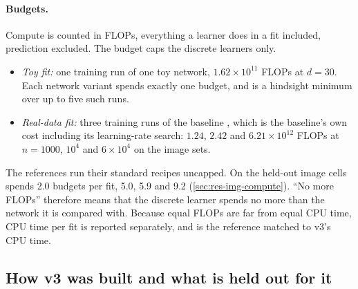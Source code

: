\paragraph{Budgets.} Compute is counted in FLOPs, everything a learner does in a fit included, prediction excluded. The budget caps the discrete learners only.
\begin{itemize}
\item \emph{Toy fit:} one training run of one toy network, $1.62\times10^{11}$ FLOPs at $d=30$. Each network variant spends exactly one budget, and  is a hindsight minimum over up to five such runs.
\item \emph{Real-data fit:} three training runs of the baseline , which is the baseline's own cost including its learning-rate search: $1.24$, $2.42$ and $6.21\times10^{12}$ FLOPs at $n=1000$, $10^4$ and $6\times10^4$ on the image sets.
\end{itemize}
The references run their standard recipes uncapped. On the held-out image cells  spends 2.0 budgets per fit,  5.0,  5.9 and  9.2 (\cref{sec:res-img-compute}). ``No more FLOPs'' therefore means that the discrete learner spends no more than the network it is compared with. Because equal FLOPs are far from equal CPU time, CPU time per fit is reported separately, and  is the reference matched to v3's CPU time.

\subsection{How v3 was built and what is held out for it}\label{sec:discipline}

